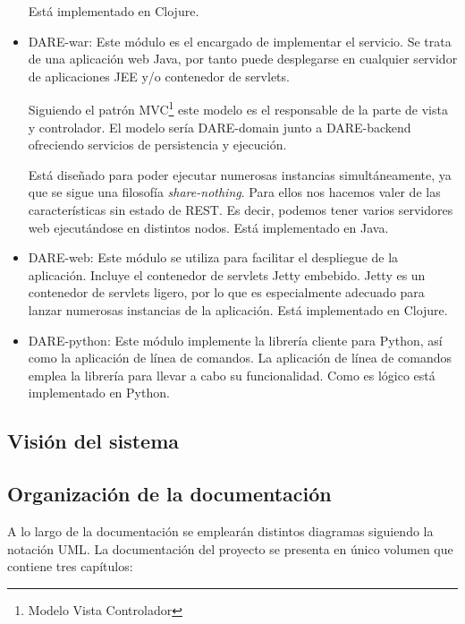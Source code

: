 \begin{itemize}
    Está implementado en Clojure.

  \item DARE-war: Este módulo es el encargado de implementar el
    servicio. Se trata de una aplicación web Java, por tanto puede
    desplegarse en cualquier servidor de aplicaciones JEE y/o
    contenedor de servlets.

    Siguiendo el patrón MVC\footnote{Modelo Vista Controlador} este
    modelo es el responsable de la parte de vista y controlador. El
    modelo sería DARE-domain junto a DARE-backend ofreciendo servicios
    de persistencia y ejecución.

    Está diseñado para poder ejecutar numerosas instancias
    simultáneamente, ya que se sigue una filosofía
    \emph{share-nothing}. Para ellos nos hacemos valer de las
    características sin estado de REST. Es decir, podemos tener varios
    servidores web ejecutándose en distintos nodos. Está implementado
    en Java.

  \item DARE-web: Este módulo se utiliza para facilitar el despliegue
    de la aplicación. Incluye el contenedor de servlets
    Jetty\cite{JETTY} embebido. Jetty es un contenedor de servlets
    ligero, por lo que es especialmente adecuado para lanzar numerosas
    instancias de la aplicación. Está implementado en Clojure.

  \item DARE-python: Este módulo implemente la librería cliente para
    Python, así como la aplicación de línea de comandos. La aplicación
    de línea de comandos emplea la librería para llevar a cabo su
    funcionalidad. Como es lógico está implementado en Python.

\end{itemize}

\subsection{Visión del sistema}
\subsection{Organización de la documentación}

A lo largo de la documentación se emplearán distintos diagramas
siguiendo la notación UML\cite{UML}. La documentación del proyecto se
presenta en único volumen que contiene tres capítulos:

